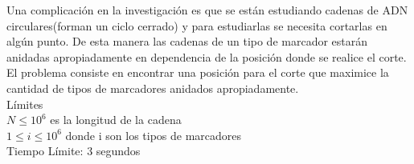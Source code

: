 \documentclass{report}
\begin{document}
Una complicaci\'on en la investigaci\'on es que se est\'an estudiando cadenas de ADN circulares(forman un ciclo cerrado) y para estudiarlas se necesita cortarlas en alg\'un punto. De esta manera las cadenas de un tipo de marcador estar\'an anidadas apropiadamente en dependencia de la posici\'on donde se realice el corte.\\

El problema consiste en encontrar una posici\'on para el corte que maximice la cantidad de tipos de marcadores anidados apropiadamente.\\

L\'imites\\
$N \leq 10^6$ es la longitud de la cadena\\
$1 \leq i \leq 10^6$ donde i son los tipos de marcadores\\
Tiempo L\'imite: 3 segundos\\
\end{document}
